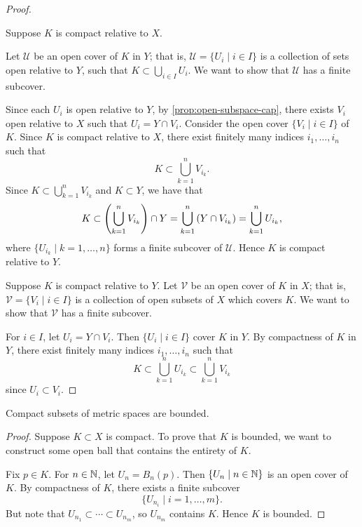 \begin{proof} \

\forward Suppose $K$ is compact relative to $X$. 

Let $\mathcal{U}$ be an open cover of $K$ in $Y$; that is, $\mathcal{U}=\{U_i\mid i\in I\}$ is a collection of sets open relative to $Y$, such that $K\subset\bigcup_{i\in I}U_i$. We want to show that $\mathcal{U}$ has a finite subcover.

Since each $U_i$ is open relative to $Y$, by \ref{prop:open-subspace-cap}, there exists $V_i$ open relative to $X$ such that $U_i=Y\cap V_i$. Consider the open cover $\{V_i\mid i\in I\}$ of $K$. Since $K$ is compact relative to $X$, there exist finitely many indices $i_1,\dots,i_n$ such that
\[K\subset\bigcup_{k=1}^{n}V_{i_k}.\]
Since $K\subset\bigcup_{k=1}^{n}V_{i_k}$ and $K\subset Y$, we have that
\[K\subset\left(\bigcup_{k=1}^{n}V_{i_k}\right)\cap Y=\bigcup_{k=1}^{n}\left(Y\cap V_{i_k}\right)=\bigcup_{k=1}^{n}U_{i_k},\]
where $\{U_{i_k}\mid k=1,\dots,n\}$ forms a finite subcover of $\mathcal{U}$. Hence $K$ is compact relative to $Y$.

\backward Suppose $K$ is compact relative to $Y$. Let $\mathcal{V}$ be an open cover of $K$ in $X$; that is, $\mathcal{V}=\{V_i\mid i\in I\}$ is a collection of open subsets of $X$ which covers $K$. We want to show that $\mathcal{V}$ has a finite subcover.

For $i\in I$, let $U_i=Y\cap V_i$. Then $\{U_i\mid i\in I\}$ cover $K$ in $Y$. By compactness of $K$ in $Y$, there exist finitely many indices $i_1,\dots,i_n$ such that
\[K\subset\bigcup_{k=1}^{n}U_{i_k}\subset\bigcup_{k=1}^{n}V_{i_k}\]
since $U_i\subset V_i$.
\end{proof}

\begin{proposition}\label{prop:compact-bounded}
Compact subsets of metric spaces are bounded.
\end{proposition}

\begin{proof}
Suppose $K\subset X$ is compact. To prove that $K$ is bounded, we want to construct some open ball that contains the entirety of $K$.

Fix $p\in K$. For $n\in\mathbb N$, let $U_n=B_n(p)$. Then $\{U_n\mid n\in\mathbb N\}$ is an open cover of $K$. By compactness of $K$, there exists a finite subcover
\[\{U_{n_i}\mid i=1,\dots,m\}.\]
But note that $U_{n_1}\subset\cdots\subset U_{n_m}$, so $U_{n_m}$ contains $K$. Hence $K$ is bounded.
\end{proof}

